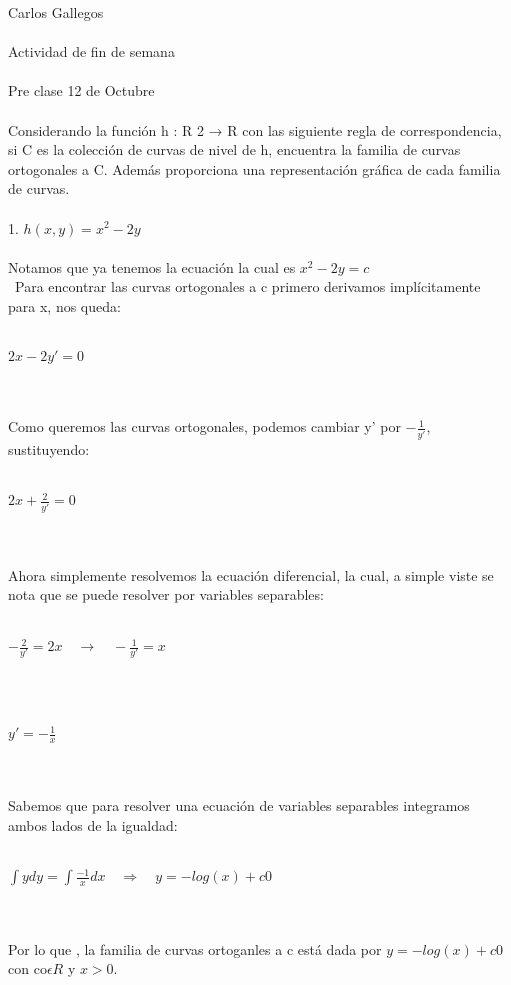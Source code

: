 \documentclass[a4paper,10pt]{article}
\title{}
\author{}
\date{}
\begin{document}
\maketitle
Carlos Gallegos\\\\
Actividad de fin de semana\\\\
Pre clase 12 de Octubre\\\\
Considerando la función h : R
2 → R con las siguiente regla de
correspondencia, si C es la colección de curvas de nivel de h,
encuentra la familia de curvas ortogonales a C. Además
proporciona una representación gráfica de cada familia de curvas.\\\\
1. $h(x,y)=x^2 -2y$\\\\
Notamos que ya tenemos la ecuación la cual es $x^2 -2y = c$\\\
Para encontrar las curvas ortogonales a c primero derivamos implícitamente para x, nos queda:\\\\
\centerline{$2x -2y' = 0$}\\\\
Como queremos las curvas ortogonales, podemos cambiar y' por $-\frac{1}{y'}$, sustituyendo:\\\\
\centerline{$2x + \frac{2}{y'} = 0 $}\\\\
Ahora simplemente resolvemos la ecuación diferencial, la cual, a simple viste se nota que se puede resolver por variables separables:\\\\
\centerline{$-\frac{2}{y'} = 2x \quad \rightarrow\quad -\frac{1}{y'}= x$}\\\\ 
\centerline{$y'=-\frac{1}{x}$}\\\\
Sabemos que para resolver una ecuación de variables separables integramos ambos lados de la igualdad:\\\\
\centerline{$\int y dy = \int \frac{-1}{x} dx\quad\Longrightarrow\quad y=-log(x) + c0$}\\\\
Por lo que , la familia de curvas ortoganles a c está dada por $y=-log(x) + c0$ con co$\epsilon R$ y $x>0$.\\\\\\
\end{document}

